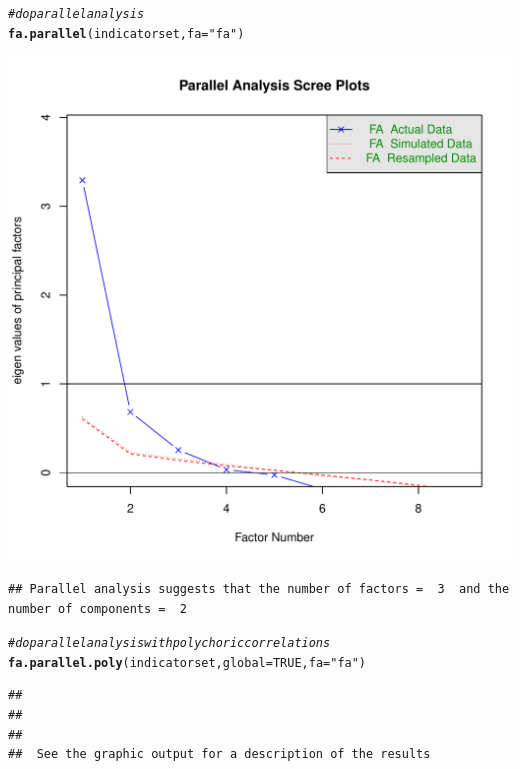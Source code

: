 \documentclass{article}\usepackage[]{graphicx}\usepackage[]{color}
\makeatletter
\def\maxwidth{ %
  \ifdim\Gin@nat@width>\linewidth
    \linewidth
  \else
    \Gin@nat@width
  \fi
}
\newcommand{\hlnum}[1]{\textcolor[rgb]{0.686,0.059,0.569}{#1}}%
\newcommand{\hlstr}[1]{\textcolor[rgb]{0.192,0.494,0.8}{#1}}%
\newcommand{\hlcom}[1]{\textcolor[rgb]{0.678,0.584,0.686}{\textit{#1}}}%
\newcommand{\hlstd}[1]{\textcolor[rgb]{0.345,0.345,0.345}{#1}}%
\newcommand{\hlkwc}[1]{\textcolor[rgb]{0.333,0.667,0.333}{#1}}%
\newcommand{\hlkwd}[1]{\textcolor[rgb]{0.737,0.353,0.396}{\textbf{#1}}}%
\newenvironment{kframe}{%
 \def\at@end@of@kframe{}%
 \ifinner\ifhmode%
  \def\at@end@of@kframe{\end{minipage}}%
  \begin{minipage}{\columnwidth}%
 \fi\fi%
 \def\FrameCommand##1{\hskip\@totalleftmargin \hskip-\fboxsep
 \colorbox{shadecolor}{##1}\hskip-\fboxsep
     \hskip-\linewidth \hskip-\@totalleftmargin \hskip\columnwidth}%
 \MakeFramed {\advance\hsize-\width
   \@totalleftmargin\z@ \linewidth\hsize
   \@setminipage}}%
 {\par\unskip\endMakeFramed%
 \at@end@of@kframe}
\newenvironment{knitrout}{}{} %
\makeatother
\begin{document}
\begin{knitrout}
\begin{kframe}
\begin{alltt}
\hlcom{#do parallel analysis}
\hlkwd{fa.parallel}\hlstd{(indicatorset,}\hlkwc{fa}\hlstd{=}\hlstr{"fa"}\hlstd{)}
\end{alltt}
\end{kframe}
\includegraphics[width=\maxwidth]{figure/psych1} 
\begin{kframe}\begin{verbatim}
## Parallel analysis suggests that the number of factors =  3  and the number of components =  2
\end{verbatim}
\begin{alltt}
\hlcom{#do parallel analysis with polychoric correlations }
\hlkwd{fa.parallel.poly}\hlstd{(indicatorset,}\hlkwc{global}\hlstd{=}\hlnum{TRUE}\hlstd{,}\hlkwc{fa}\hlstd{=}\hlstr{"fa"}\hlstd{)}
\end{alltt}
\begin{verbatim}
## 
## 
## 
##  See the graphic output for a description of the results
\end{verbatim}
\end{kframe}

\end{knitrout}
\end{document}
